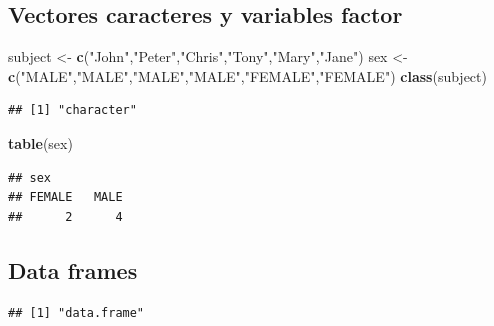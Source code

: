\documentclass[]{article}
\newenvironment{Shaded}{\begin{snugshade}}{\end{snugshade}}
\newcommand{\KeywordTok}[1]{\textcolor[rgb]{0.13,0.29,0.53}{\textbf{{#1}}}}
\newcommand{\StringTok}[1]{\textcolor[rgb]{0.31,0.60,0.02}{{#1}}}
\newcommand{\CommentTok}[1]{\textcolor[rgb]{0.56,0.35,0.01}{\textit{{#1}}}}
\newcommand{\NormalTok}[1]{{#1}}
\numberwithin{equation}{section}
\begin{document}
\subsection{Vectores caracteres y variables
factor}\label{vectores-caracteres-y-variables-factor}

\begin{Shaded}
\begin{Highlighting}[]
\NormalTok{subject <-}\StringTok{ }\KeywordTok{c}\NormalTok{(}\StringTok{"John"}\NormalTok{,}\StringTok{"Peter"}\NormalTok{,}\StringTok{"Chris"}\NormalTok{,}\StringTok{"Tony"}\NormalTok{,}\StringTok{"Mary"}\NormalTok{,}\StringTok{"Jane"}\NormalTok{)}
\NormalTok{sex <-}\StringTok{ }\KeywordTok{c}\NormalTok{(}\StringTok{"MALE"}\NormalTok{,}\StringTok{"MALE"}\NormalTok{,}\StringTok{"MALE"}\NormalTok{,}\StringTok{"MALE"}\NormalTok{,}\StringTok{"FEMALE"}\NormalTok{,}\StringTok{"FEMALE"}\NormalTok{)}
\KeywordTok{class}\NormalTok{(subject)}
\end{Highlighting}
\end{Shaded}

\begin{verbatim}
## [1] "character"
\end{verbatim}

\begin{Shaded}
\begin{Highlighting}[]
\KeywordTok{table}\NormalTok{(sex)}
\end{Highlighting}
\end{Shaded}

\begin{verbatim}
## sex
## FEMALE   MALE 
##      2      4
\end{verbatim}

\subsection{Data frames}\label{data-frames}

\begin{Shaded}
\end{Shaded}

\begin{verbatim}
## [1] "data.frame"
\end{verbatim}
\end{document}
